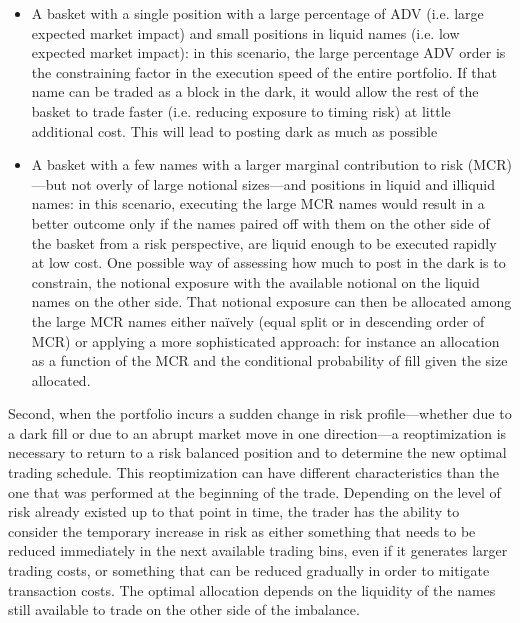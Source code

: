 \begin{itemize}
\item A basket with a single position with a large percentage of ADV (i.e. large expected market impact) and small positions in liquid names (i.e. low expected market impact): in this scenario, the large percentage ADV order is the constraining factor in the execution speed of the entire portfolio. If that name can be traded as a block in the dark, it would allow the rest of the basket to trade faster (i.e. reducing exposure to timing risk) at little additional cost. This will lead to posting dark as much as possible

\item A basket with a few names with a larger marginal contribution to risk (MCR)---but not overly of large notional sizes---and positions in liquid and illiquid names: in this scenario, executing the large MCR names would result in a better outcome only if the names paired off with them on the other side of the basket from a risk perspective, are liquid enough to be executed rapidly at low cost. One possible way of assessing how much to post in the dark is to constrain, the notional exposure with the available notional on the liquid names on the other side. That notional exposure can then be allocated among the large MCR names either na\"ively (equal split or in descending order of MCR) or applying a more sophisticated approach: for instance an allocation as a function of the MCR and the conditional probability of fill given the size allocated.
\end{itemize}


Second, when the portfolio incurs a sudden change in risk profile---whether due to a dark fill or due to an abrupt market move in one direction---a reoptimization is necessary to return to a risk balanced position and to determine the new optimal trading schedule. This reoptimization can have different characteristics than the one that was performed at the beginning of the trade. Depending on the level of risk already existed up to that point in time, the trader has the ability to consider the temporary increase in risk as either something that needs to be reduced immediately in the next available trading bins, even if it generates larger trading costs, or something that can be reduced gradually in order to mitigate transaction costs. The optimal allocation depends on the liquidity of the names still available to trade on the other side of the imbalance. \twomedskip


